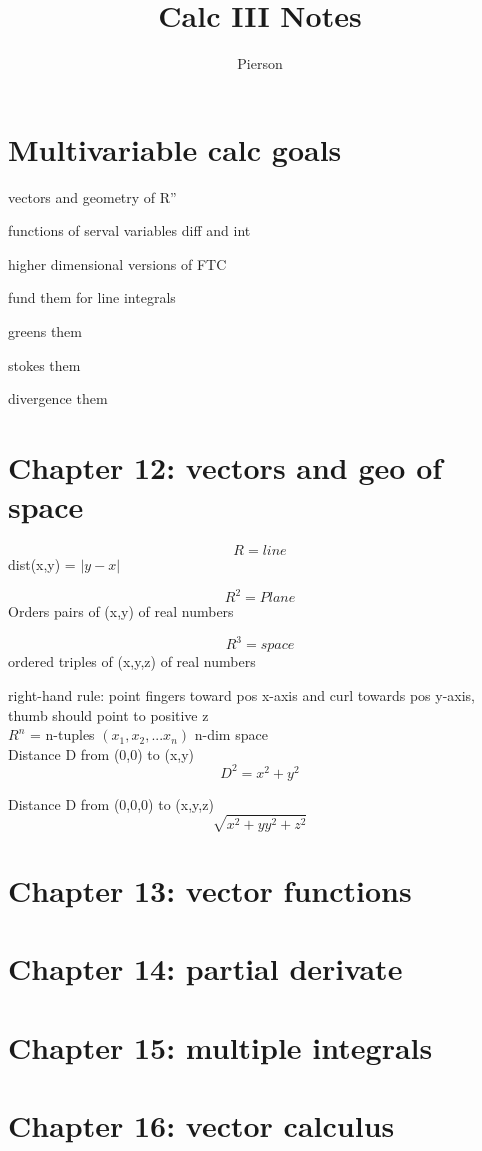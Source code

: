 \documentclass{article}
\author{Pierson}
\begin{document}
\title{Calc III Notes}

\maketitle

\section{Multivariable calc goals}
\begin{list}{-}{}
    \item vectors and geometry of R''
    \item functions of serval variables diff and int
    \item higher dimensional versions of FTC
    \item fund them for line integrals
    \item greens them
    \item stokes them
    \item divergence them
\end{list}


\section{Chapter 12: vectors and geo of space}
    \begin{list}{-}{}
    \item \[R = line\] dist(x,y) = $ |y - x | $
    \item \[R^2 = Plane\] Orders pairs of (x,y) of real numbers
    \item \[R^3 = space\] ordered triples of (x,y,z) of real numbers
    \end{list}

right-hand rule: point fingers toward pos x-axis and curl towards pos y-axis, thumb should point to positive z\\


$R^n$ = n-tuples $(x_1, x_2, ... x_n)$ n-dim space\\

Distance D from (0,0) to (x,y)
\[D^2 = x^2 +y^2\]

Distance D from (0,0,0) to (x,y,z)
\[\sqrt{x^2+yy^2+z^2}\] 

\section{Chapter 13: vector functions}

\section{Chapter 14: partial derivate}

\section{Chapter 15: multiple integrals}

\section{Chapter 16: vector calculus}
\end{document}

